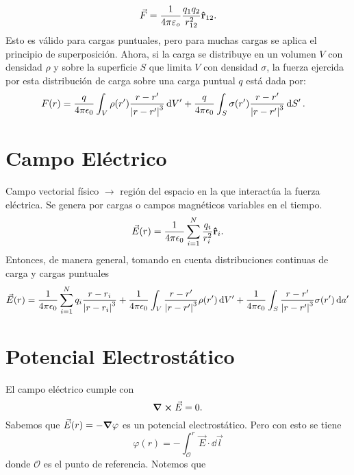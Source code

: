 \begin{equation}
	\vec{F} = \frac{1}{4\pi \varepsilon _o} \frac{q_1 q_2}{r_{12} ^2} \vu{r}_{12}.
\end{equation}
Esto es válido para cargas puntuales, pero para muchas cargas se aplica el principio de superposición. Ahora, si la carga se distribuye en un volumen $V$ con densidad $\rho$ y sobre la superficie $S$ que limita $V$ con densidad $\sigma$, la fuerza ejercida por esta distribución de carga sobre una carga puntual $q$ está dada por:
\begin{align}
	F(r) &= \frac{q}{4\pi \epsilon_0} \int _V \rho (r') \frac{r - r'}{\abs{r - r'}^3} \dd{V'} + \frac{q}{4\pi \epsilon_0} \int _S \sigma (r') \frac{r - r'}{\abs{r - r'}^3} \dd{S'}.
\end{align}


\section{Campo Eléctrico}
Campo vectorial físico $\to$ región del espacio en la que interactúa la fuerza eléctrica. Se genera por cargas o campos magnéticos variables en el tiempo.
\begin{equation}
	\vec{E} (r) = \frac{1}{4\pi \epsilon_0} \sum _{i=1} ^N \frac{q_i}{r_i ^2} \vu{r} _i.
\end{equation}
Entonces, de manera general, tomando en cuenta distribuciones continuas de carga y cargas puntuales
\begin{equation}
	\vec{E} (r) = \frac{1}{4\pi \epsilon_0} \sum _{i=1} ^N q_i \frac{r - r_i}{\abs{r - r_i}^3} + \frac{1}{4\pi \epsilon_0} \int _V \frac{r - r'}{\abs{r - r'}^3} \rho (r') \dd{V'} + \frac{1}{4\pi \epsilon_0} \int _S \frac{r - r'}{\abs{r - r'}^3} \sigma (r') \dd{a'}
\end{equation}



\section{Potencial Electrostático}
El campo eléctrico cumple con
\begin{equation}
	\curl{\vec{E}} = 0.
\end{equation}
Sabemos que $\vec{E} (r) = -\grad{\varphi}$ es un potencial electrostático. Pero con esto se tiene
\begin{equation}
	\varphi (r) = -\int _{\mathcal{O}} ^r \vec{E} \cdot \dd{\vec{l}}
\end{equation}
donde $\mathcal{O}$ es el punto de referencia. Notemos que

